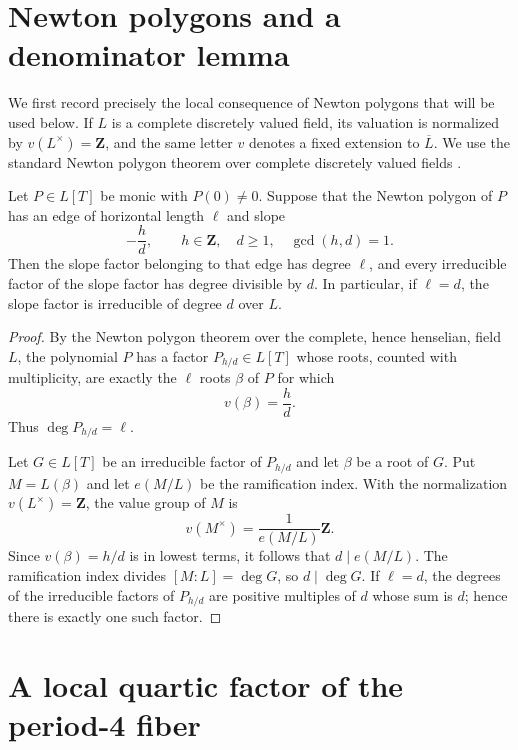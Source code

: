 \section{Newton polygons and a denominator lemma}
\label{sec:newton-denominator}

We first record precisely the local consequence of Newton polygons that
will be used below.  If $L$ is a complete discretely valued field, its
valuation is normalized by $v(L^\times)=\mathbf Z$, and the same letter
$v$ denotes a fixed extension to $\overline{L}$.  We use the standard
Newton polygon theorem over complete discretely valued fields
\cite[Chapter II, \S6, Propositions (6.3) and (6.4)]{Neukirch1999}.

\begin{lemma}
\label{lem:newton-denominator}
Let $P\in L[T]$ be monic with $P(0)\ne0$.  Suppose that the Newton
polygon of $P$ has an edge of horizontal length $\ell$ and slope
\[
 -\frac{h}{d},
 \qquad h\in\mathbf Z,
 \quad d\geq1,
 \quad \gcd(h,d)=1.
\]
Then the slope factor belonging to that edge has degree $\ell$, and
every irreducible factor of the slope factor has degree divisible by
$d$.  In particular, if $\ell=d$, the slope factor is irreducible of
degree $d$ over $L$.
\end{lemma}

\begin{proof}
By the Newton polygon theorem over the complete, hence henselian, field
$L$, the polynomial $P$ has a factor $P_{h/d}\in L[T]$ whose roots,
counted with multiplicity, are exactly the $\ell$ roots $\beta$ of $P$
for which
\[
 v(\beta)=\frac{h}{d}.
\]
Thus $\deg P_{h/d}=\ell$.

Let $G\in L[T]$ be an irreducible factor of $P_{h/d}$ and let $\beta$
be a root of $G$.  Put $M=L(\beta)$ and let $e(M/L)$ be the ramification
index.  With the normalization $v(L^\times)=\mathbf Z$, the value group
of $M$ is
\[
 v(M^\times)=\frac1{e(M/L)}\mathbf Z.
\]
Since $v(\beta)=h/d$ is in lowest terms, it follows that
$d\mid e(M/L)$.  The ramification index divides $[M:L]=\deg G$, so
$d\mid\deg G$.  If $\ell=d$, the degrees of the irreducible factors of
$P_{h/d}$ are positive multiples of $d$ whose sum is $d$; hence there
is exactly one such factor.
\end{proof}

\section{A local quartic factor of the period-4 fiber}
\label{sec:local-quartic-fiber}

